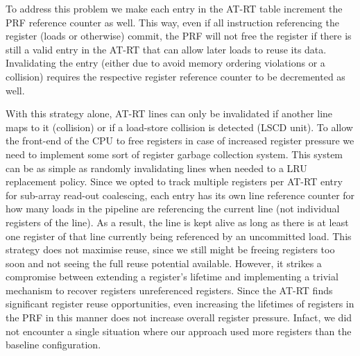 \documentclass{sig-alternate}
\begin{document}

To address this problem we make each entry in the AT-RT table increment the PRF reference counter as well. This way, even if all instruction referencing the register (loads or otherwise) commit, the PRF will not free the register if there is still a valid entry in the AT-RT that can allow later loads to reuse its data. Invalidating the entry (either due to avoid memory ordering violations or a collision) requires the respective register reference counter to be decremented as well.

With this strategy alone, AT-RT lines can only be invalidated if another line maps to it (collision) or if a load-store collision is detected (LSCD unit). To allow the front-end of the CPU to free registers in case of increased register pressure we need to implement some sort of register garbage collection system. This system can be as simple as randomly invalidating lines when needed to a LRU replacement policy. Since we opted to track multiple registers per AT-RT entry for sub-array read-out coalescing, each entry has its own line reference counter for how many loads in the pipeline are referencing the current line (not individual registers of the line). As a result, the line is kept alive as long as there is at least one register of that line currently being referenced by an uncommitted load. This strategy does not maximise reuse, since we still might be freeing registers too soon and not seeing the full reuse potential available. However, it strikes a compromise between extending a register's lifetime and implementing a trivial mechanism to recover registers unreferenced registers. Since the AT-RT finds significant register reuse opportunities, even increasing the lifetimes of registers in the PRF in this manner does not increase overall register pressure. Infact, we did not  encounter a single situation where our approach used more registers than the baseline configuration.   


\end{document}
